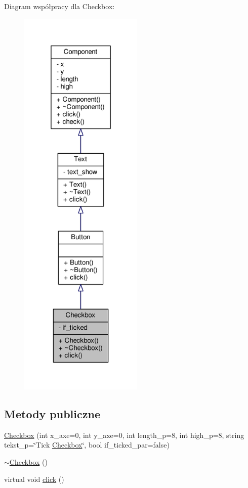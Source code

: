Diagram współpracy dla Checkbox\+:
\nopagebreak
\begin{figure}[H]
\begin{center}
\leavevmode
\includegraphics[height=550pt]{classCheckbox__coll__graph}
\end{center}
\end{figure}
\subsection*{Metody publiczne}
\begin{DoxyCompactItemize}
\item 
\hyperlink{classCheckbox_a44d2ffeb1990a715b7d99f7ad48d36cf}{Checkbox} (int x\+\_\+axe=0, int y\+\_\+axe=0, int length\+\_\+p=8, int high\+\_\+p=8, string tekst\+\_\+p=\char`\"{}Tick \hyperlink{classCheckbox}{Checkbox}\char`\"{}, bool if\+\_\+ticked\+\_\+par=false)
\item 
\hyperlink{classCheckbox_a828c1436e32c8be0d9d395286d8e6bfe}{$\sim$\+Checkbox} ()
\item 
virtual void \hyperlink{classCheckbox_afd75946a43da1dcba8e6f04f00df34ee}{click} ()
\end{DoxyCompactItemize}
